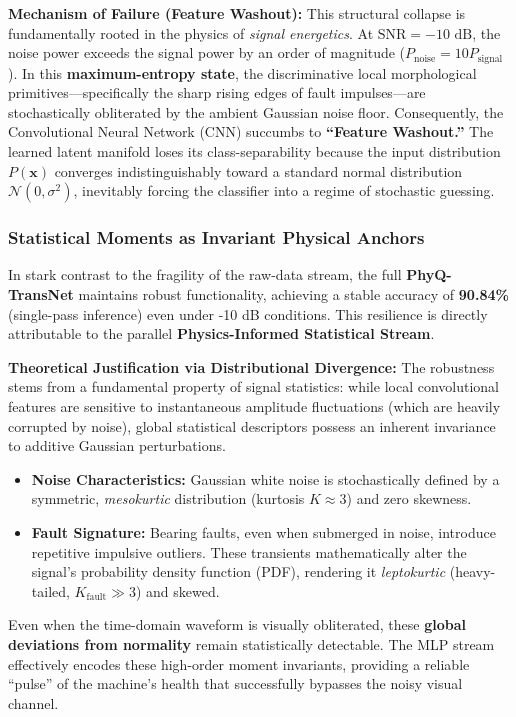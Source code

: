 \documentclass[5p,times,twocolumn]{elsarticle}
\begin{document}
\textbf{Mechanism of Failure (Feature Washout):}
This structural collapse is fundamentally rooted in the physics of \textit{signal energetics}. At $\text{SNR} = -10 \text{ dB}$, the noise power exceeds the signal power by an order of magnitude ($P_{\text{noise}} = 10 P_{\text{signal}}$).
In this \textbf{maximum-entropy state}, the discriminative local morphological primitives---specifically the sharp rising edges of fault impulses---are stochastically obliterated by the ambient Gaussian noise floor. Consequently, the Convolutional Neural Network (CNN) succumbs to \textbf{``Feature Washout.''} The learned latent manifold loses its class-separability because the input distribution $P(\mathbf{x})$ converges indistinguishably toward a standard normal distribution $\mathcal{N}(0, \sigma^2)$, inevitably forcing the classifier into a regime of stochastic guessing.

\subsubsection{Statistical Moments as Invariant Physical Anchors}
In stark contrast to the fragility of the raw-data stream, the full \textbf{PhyQ-TransNet} maintains robust functionality, achieving a stable accuracy of \textbf{90.84\%} (single-pass inference) even under -10 dB conditions. This resilience is directly attributable to the parallel \textbf{Physics-Informed Statistical Stream}.

\textbf{Theoretical Justification via Distributional Divergence:}
The robustness stems from a fundamental property of signal statistics: while local convolutional features are sensitive to instantaneous amplitude fluctuations (which are heavily corrupted by noise), global statistical descriptors possess an inherent invariance to additive Gaussian perturbations.
\begin{itemize}
    \item \textbf{Noise Characteristics:} Gaussian white noise is stochastically defined by a symmetric, \textit{mesokurtic} distribution (kurtosis $K \approx 3$) and zero skewness.
    \item \textbf{Fault Signature:} Bearing faults, even when submerged in noise, introduce repetitive impulsive outliers. These transients mathematically alter the signal's probability density function (PDF), rendering it \textit{leptokurtic} (heavy-tailed, $K_{\text{fault}} \gg 3$) and skewed.
\end{itemize}
Even when the time-domain waveform is visually obliterated, these \textbf{global deviations from normality} remain statistically detectable. The MLP stream effectively encodes these high-order moment invariants, providing a reliable ``pulse'' of the machine's health that successfully bypasses the noisy visual channel.
\end{document}
